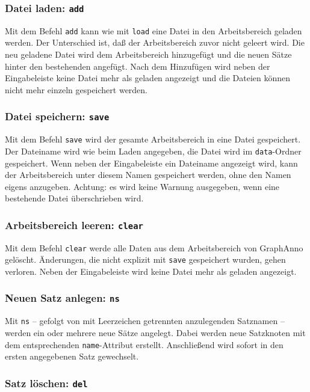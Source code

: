 \documentclass[12pt]{scrartcl}
\begin{document}
\subsubsection{Datei laden: \texttt{add}}

Mit dem Befehl \texttt{add} kann wie mit \texttt{load} eine Datei in den Arbeitsbereich geladen werden. Der Unterschied ist, daß der Arbeitsbereich zuvor nicht geleert wird. Die neu geladene Datei wird dem Arbeitsbereich hinzugefügt und die neuen Sätze hinter den bestehenden angefügt. Nach dem Hinzufügen wird neben der Eingabeleiste keine Datei mehr als geladen angezeigt und die Dateien können nicht mehr einzeln gespeichert werden.


\subsubsection{Datei speichern: \texttt{save}}

Mit dem Befehl \texttt{save} wird der gesamte Arbeitsbereich in eine Datei gespeichert. Der Dateiname wird wie beim Laden angegeben, die Datei wird im \texttt{data}-Ordner gespeichert. Wenn neben der Eingabeleiste ein Dateiname angezeigt wird, kann der Arbeitsbereich unter diesem Namen gespeichert werden, ohne den Namen eigens anzugeben.
Achtung: es wird keine Warnung ausgegeben, wenn eine bestehende Datei überschrieben wird.


\subsubsection{Arbeitsbereich leeren: \texttt{clear}}

Mit dem Befehl \texttt{clear} werde alle Daten aus dem Arbeitsbereich von GraphAnno gelöscht. Änderungen, die nicht explizit mit \texttt{save} gespeichert wurden, gehen verloren.
Neben der Eingabeleiste wird keine Datei mehr als geladen angezeigt.


\subsubsection{Neuen Satz anlegen: \texttt{ns}}\label{befehl-ns}

Mit \texttt{ns} – gefolgt von mit Leerzeichen getrennten anzulegenden Satznamen – werden ein oder mehrere neue Sätze angelegt. Dabei werden neue Satzknoten mit dem entsprechenden \texttt{name}-Attribut erstellt. Anschließend wird sofort in den ersten angegebenen Satz gewechselt.


\subsubsection{Satz löschen: \texttt{del}}
\end{document}
